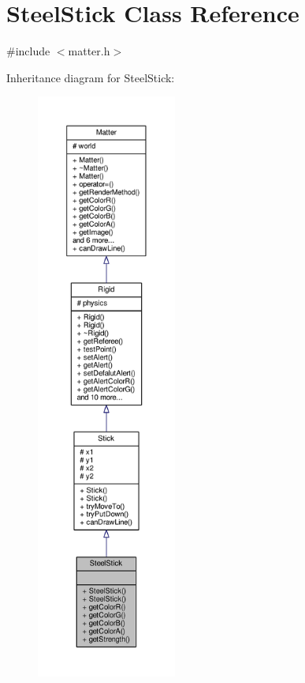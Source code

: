 \hypertarget{classSteelStick}{}\section{Steel\+Stick Class Reference}
\label{classSteelStick}


{\ttfamily \#include $<$matter.\+h$>$}



Inheritance diagram for Steel\+Stick\+:\nopagebreak
\begin{figure}[H]
\begin{center}
\leavevmode
\includegraphics[height=550pt]{classSteelStick__inherit__graph}
\end{center}
\end{figure}


